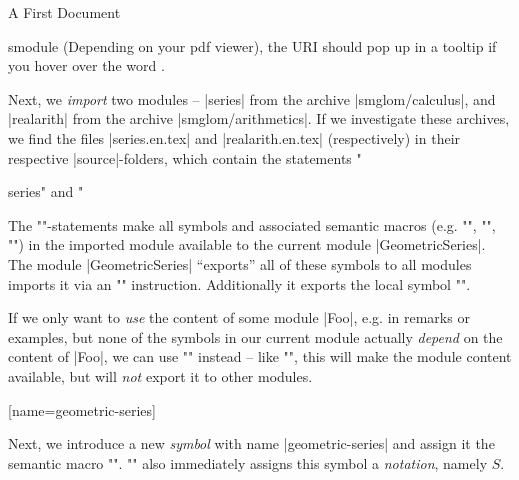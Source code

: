 \begin{sfragment}{A First \sTeX Document}
\begin{environment}{smodule}
      (Depending on your pdf viewer), the URI should pop up in a tooltip if you hover over
      the word .
    \end{environment}\bigskip

    \begin{function}{\importmodule}
      \begin{latexcode}[numbers=none,aboveskip=0pt,belowskip=0pt,gobble=8]
      \end{latexcode}
      Next, we \emph{import} two modules -- |series| from the \sTeX archive
      |smglom/calculus|, and |realarith| from the \sTeX archive |smglom/arithmetics|. If
      we investigate these archives, we find the files |series.en.tex| and
      |realarith.en.tex| (respectively) in their respective |source|-folders, which
      contain the statements \stexcode"\begin{smodule}{series}" and
        \stexcode"\end{smodule}\fi

      The \stexcode"\importmodule"-statements make all \stex symbols and associated
      semantic macros (e.g. \stexcode"\infinitesum", \stexcode"\realdivide",
      \stexcode"\realpower") in the imported module available to the current module
      |GeometricSeries|. The module |GeometricSeries| ``exports'' all of these symbols to
      all modules imports it via an \stexcode""
      instruction. Additionally it exports the local symbol \stexcode"\geometricSeries".
    \end{function}

    \begin{function}{\usemodule}
      If we only want to \emph{use} the content of some module |Foo|,
      e.g. in remarks or examples, but none
      of the symbols in our current module actually \emph{depend} on
      the content of |Foo|, we can use \stexcode"\usemodule" instead -- like
      \stexcode"\importmodule", this will make the module content available,
      but will \emph{not} export it to other modules.
    \end{function}\bigskip

    \begin{function}{\symdef}
      \begin{latexcode}[numbers=none,aboveskip=0pt,belowskip=0pt,gobble=6]
        [name=geometric-series]{}
      \end{latexcode}
      Next, we introduce a new \emph{symbol} with name
      |geometric-series| and assign it the semantic macro
      \stexcode"\geometricSeries".
      \stexcode"\symdef" also immediately assigns this symbol a \emph{notation},
      namely $S$.
    \end{function}


\end{sfragment}
